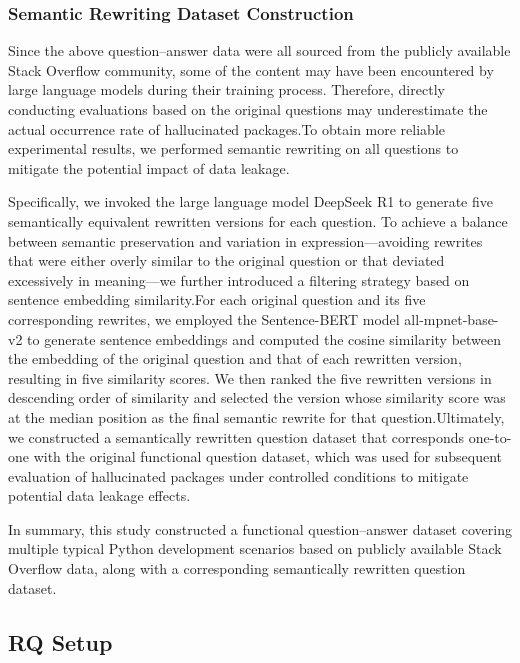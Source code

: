\subsubsection{Semantic Rewriting Dataset Construction}
Since the above question–answer data were all sourced from the publicly available Stack Overflow community, some of the content may have been encountered by large 
language models during their training process. Therefore, directly conducting evaluations based on the original questions may underestimate the actual occurrence 
rate of hallucinated packages.To obtain more reliable experimental results, we performed semantic rewriting on all questions to mitigate the potential impact of 
data leakage.

Specifically, we invoked the large language model DeepSeek R1 to generate five semantically equivalent rewritten versions for each question. To achieve a balance 
between semantic preservation and variation in expression—avoiding rewrites that were either overly similar to the original question or that deviated excessively 
in meaning—we further introduced a filtering strategy based on sentence embedding similarity.For each original question and its five corresponding rewrites, we 
employed the Sentence-BERT model all-mpnet-base-v2 to generate sentence embeddings and computed the cosine similarity between the embedding of the original question 
and that of each rewritten version, resulting in five similarity scores. We then ranked the five rewritten versions in descending order of similarity and 
selected the version whose similarity score was at the median position as the final semantic rewrite for that question.Ultimately, we constructed a semantically 
rewritten question dataset that corresponds one-to-one with the original functional question dataset, which was used for subsequent evaluation of hallucinated 
packages under controlled conditions to mitigate potential data leakage effects.

In summary, this study constructed a functional question–answer dataset covering multiple typical Python development scenarios based on publicly available Stack 
Overflow data, along with a corresponding semantically rewritten question dataset.


\subsection{RQ Setup}
